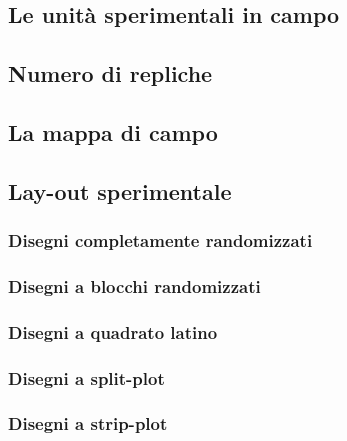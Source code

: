 \documentclass[a4paper,12pt,oneside]{book}
\begin{document}
\hypertarget{le-unituxe0-sperimentali-in-campo}{%
\subsection{Le unità sperimentali in campo}\label{le-unituxe0-sperimentali-in-campo}}

\hypertarget{numero-di-repliche}{%
\subsection{Numero di repliche}\label{numero-di-repliche}}

\hypertarget{la-mappa-di-campo}{%
\subsection{La mappa di campo}\label{la-mappa-di-campo}}

\hypertarget{lay-out-sperimentale}{%
\subsection{Lay-out sperimentale}\label{lay-out-sperimentale}}

\hypertarget{disegni-completamente-randomizzati}{%
\subsubsection{Disegni completamente randomizzati}\label{disegni-completamente-randomizzati}}

\hypertarget{disegni-a-blocchi-randomizzati}{%
\subsubsection{Disegni a blocchi randomizzati}\label{disegni-a-blocchi-randomizzati}}

\hypertarget{disegni-a-quadrato-latino}{%
\subsubsection{Disegni a quadrato latino}\label{disegni-a-quadrato-latino}}

\hypertarget{disegni-a-split-plot}{%
\subsubsection{Disegni a split-plot}\label{disegni-a-split-plot}}

\hypertarget{disegni-a-strip-plot}{%
\subsubsection{Disegni a strip-plot}\label{disegni-a-strip-plot}}
\end{document}
